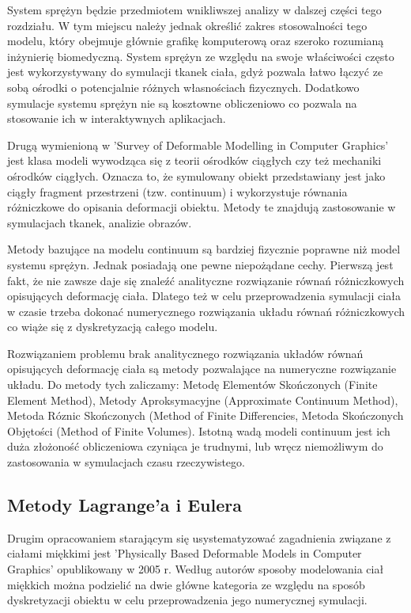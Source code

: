 System sprężyn będzie przedmiotem wnikliwszej analizy w dalszej części tego
rozdziału. W tym miejscu należy jednak określić zakres stosowalności tego
modelu, który obejmuje głównie grafikę komputerową oraz szeroko rozumianą
inżynierię biomedyczną. System sprężyn ze względu na swoje właściwości 
często jest wykorzystywany do symulacji tkanek ciała, gdyż pozwala łatwo łączyć ze
sobą ośrodki o potencjalnie różnych własnościach fizycznych. Dodatkowo symulacje
systemu sprężyn nie są kosztowne obliczeniowo co pozwala na stosowanie ich w
interaktywnych aplikacjach.

Drugą wymienioną w 'Survey of Deformable Modelling in Computer Graphics' jest
klasa modeli wywodząca się z teorii ośrodków ciągłych czy też mechaniki ośrodków
ciągłych. Oznacza to, że symulowany obiekt przedstawiany jest jako ciągły
fragment przestrzeni (tzw. continuum) i wykorzystuje równania różniczkowe do
opisania deformacji obiektu. Metody te znajdują zastosowanie w symulacjach
tkanek, analizie obrazów.\cite{TR97-19}

Metody bazujące na modelu continuum są bardziej fizycznie poprawne niż model
systemu sprężyn\cite{TR97-19}. Jednak posiadają one pewne niepożądane cechy.
Pierwszą jest fakt, że nie zawsze daje się znaleźć analityczne rozwiązanie
równań różniczkowych opisujących deformację ciała. Dlatego też w celu
przeprowadzenia symulacji ciała w czasie trzeba dokonać numerycznego rozwiązania
układu równań różniczkowych co wiąże się z dyskretyzacją całego modelu.

Rozwiązaniem problemu brak analitycznego rozwiązania układów równań opisujących
deformację ciała są metody pozwalające na numeryczne rozwiązanie układu. Do
metody tych zaliczamy: Metodę Elementów Skończonych (Finite Element Method),
 Metody Aproksymacyjne (Approximate Continuum Method), Metoda Róznic Skończonych
 (Method of Finite Differencies, Metoda Skończonych Objętości (Method of Finite
 Volumes). Istotną wadą modeli continuum jest ich duża złożoność obliczeniowa
czyniąca je trudnymi, lub wręcz niemożliwym do zastosowania w symulacjach czasu
rzeczywistego.

\subsection{Metody Lagrange'a i Eulera}

Drugim opracowaniem starającym się usystematyzować zagadnienia związane z
ciałami miękkimi jest 'Physically Based Deformable Models in Computer
Graphics' opublikowany w 2005 r. Według autorów sposoby modelowania ciał miękkich można
podzielić na dwie główne kategoria ze względu na sposób dyskretyzacji
obiektu w celu przeprowadzenia jego numerycznej symulacji.

